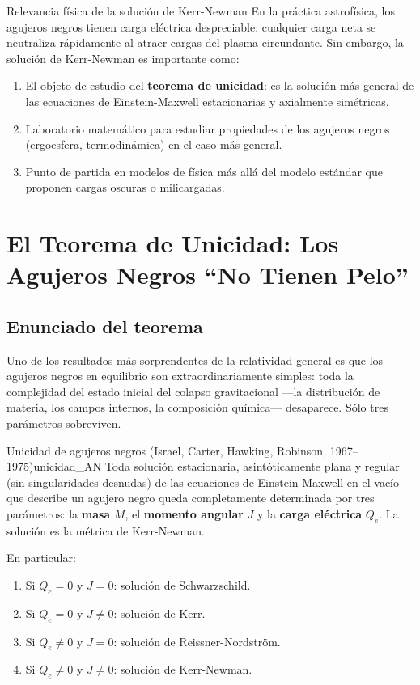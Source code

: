 \begin{observacion}{Relevancia física de la solución de Kerr-Newman}{}
En la práctica astrofísica, los agujeros negros tienen carga eléctrica despreciable: cualquier carga neta se neutraliza rápidamente al atraer cargas del plasma circundante. Sin embargo, la solución de Kerr-Newman es importante como:
\begin{enumerate}[leftmargin=2em, label=(\alph*)]
  \item El objeto de estudio del \textbf{teorema de unicidad}: es la solución más general de las ecuaciones de Einstein-Maxwell estacionarias y axialmente simétricas.
  \item Laboratorio matemático para estudiar propiedades de los agujeros negros (ergoesfera, termodinámica) en el caso más general.
  \item Punto de partida en modelos de física más allá del modelo estándar que proponen cargas oscuras o milicargadas.
\end{enumerate}
\end{observacion}

\section{El Teorema de Unicidad: Los Agujeros Negros ``No Tienen Pelo''}
\label{sec:no_hair}

\subsection{Enunciado del teorema}

Uno de los resultados más sorprendentes de la relatividad general es que los agujeros negros en equilibrio son extraordinariamente simples: toda la complejidad del estado inicial del colapso gravitacional —la distribución de materia, los campos internos, la composición química— desaparece. Sólo tres parámetros sobreviven.

\begin{teorema}{Unicidad de agujeros negros (Israel, Carter, Hawking, Robinson, 1967--1975)}{unicidad_AN}
Toda solución estacionaria, asintóticamente plana y regular (sin singularidades desnudas) de las ecuaciones de Einstein-Maxwell en el vacío que describe un agujero negro queda completamente determinada por tres parámetros: la \textbf{masa} $M$, el \textbf{momento angular} $J$ y la \textbf{carga eléctrica} $Q_e$. La solución es la métrica de Kerr-Newman.

En particular:
\begin{enumerate}[leftmargin=2em]
  \item Si $Q_e = 0$ y $J = 0$: solución de Schwarzschild.
  \item Si $Q_e = 0$ y $J \neq 0$: solución de Kerr.
  \item Si $Q_e \neq 0$ y $J = 0$: solución de Reissner-Nordström.
  \item Si $Q_e \neq 0$ y $J \neq 0$: solución de Kerr-Newman.
\end{enumerate}
\end{teorema}

